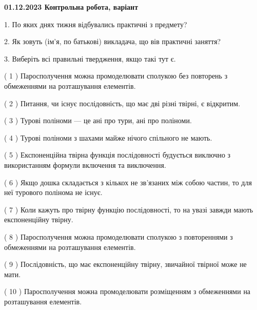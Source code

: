 \documentclass[12pt, ukrainian]{article}
\begin{document}
\vspace{4mm}
\newpage
\begin {large}

\textbf{01.12.2023 Контрольна робота, варіант  }\par


{
1. По яких днях тижня відбувались практичні з предмету?



\vspace{5mm}
2. Як зовуть (ім'я, по батькові) викладача, що вів практичні заняття?



\vspace{5mm}
3. Виберіть всі правильні твердження, якщо такі тут є.\par
\vspace{2mm}
( 1 ) Паросполучення можна промоделювати сполукою без повторень з обмеженнями на розташування елементів.%

( 2 ) Питання, чи існує послідовність, що має дві різні твірні, є відкритим.%

( 3 ) Турові поліноми --- це ані про тури, ані про поліноми.%

( 4 ) Турові поліноми з шахами майже нічого спільного не мають.%

( 5 ) Експоненційна твірна функція послідовності будується виключно з використанням формули включення та виключення.%

( 6 ) Якщо дошка складається з кількох не зв’язаних між собою частин, то для неї турового полінома не існує.%

( 7 ) Коли кажуть про твірну функцію послідовності, то на увазі завжди мають експоненційну твірну.%

( 8 ) Паросполучення можна промоделювати сполукою з повтореннями з обмеженнями на розташування елементів.%

( 9 ) Послідовність, що має експоненційну твірну, звичайної твірної може не мати.%

( 10 ) Паросполучення можна промоделювати розміщенням з обмеженнями на розташування елементів.%
}
\end {large}
\end{document}
